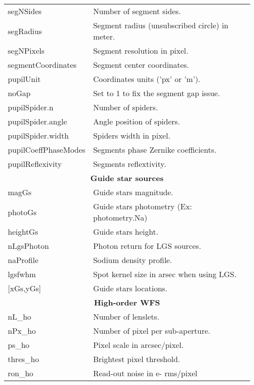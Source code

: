 \documentclass[12pt]{article}
\begin{document}
\begin{table}[H]
\begin{scriptsize}
\begin{tabular}{p{2.25cm}p{5cm}}
	    segNSides & Number of segment sides.\\
	    segRadius & Segment radius (unsubscribed circle) in meter.\\
	    segNPixels & Segment resolution in pixel.\\
	    segmentCoordinates & Segment center coordinates.\\
	    pupilUnit & Coordinates units ('px' or 'm').\\
	    noGap & Set to 1 to fix the segment gap issue.\\	    
	    pupilSpider.n & Number of spiders.\\
	    pupilSpider.angle & Angle position of spiders.\\
	    pupilSpider.width & Spiders width in pixel.\\ %
	    pupilCoeffPhaseModes & Segments phase Zernike coefficients.\\
	    pupilReflexivity     & Segments reflextivity.\\
	    \hline
		\multicolumn{2}{c}{\textbf{Guide star sources}} \\
		\hline
		magGs               & Guide stars magnitude.\\                              
		photoGs             & Guide stars photometry (Ex: photometry.Na)\\  
		heightGs            & Guide stars height.\\                             
		nLgsPhoton          & Photon return for LGS sources.\\                              
		naProfile        & Sodium density profile.\\        
		lgsfwhm             & Spot kernel size in arsec when using LGS.\\                               
		$[$xGs,yGs$]$           & Guide stars locations.\\                                                     
			\hline
		\multicolumn{2}{c}{\textbf{High-order WFS}} \\
		\hline
		nL\_ho                  & Number of lenslets.\\                               
		nPx\_ho                 & Number of pixel per sub-aperture.\\                              
		ps\_ho       & Pixel scale in arcsec/pixel.\\	
		thres\_ho               & Brightest pixel threshold.\\                              
		ron\_ho     & Read-out noise in e- rms/pixel\\                                

\end{tabular}
\end{scriptsize}
\end{table}
\end{document}
